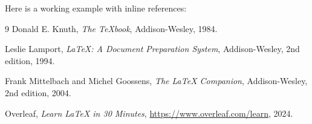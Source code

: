 Here is a working example with inline references:

\begin{thebibliography}{9}
        Donald E. Knuth,
        \textit{The \TeX{}book},
        Addison-Wesley, 1984.

        Leslie Lamport,
        \textit{\LaTeX: A Document Preparation System},
        Addison-Wesley, 2nd edition, 1994.

        Frank Mittelbach and Michel Goossens,
        \textit{The \LaTeX{} Companion},
        Addison-Wesley, 2nd edition, 2004.

        Overleaf,
        \textit{Learn \LaTeX{} in 30 Minutes},
        \url{https://www.overleaf.com/learn}, 2024.
\end{thebibliography}
